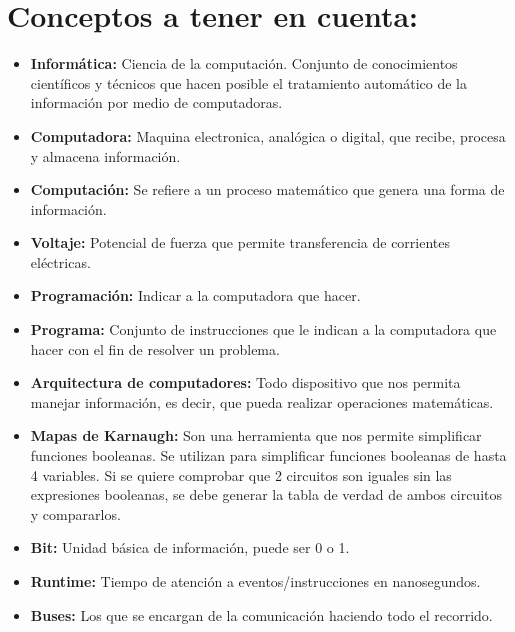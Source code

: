 \documentclass{templateNote}
\begin{document}

\portada
\margenes 

\section*{Conceptos a tener en cuenta:}
\begin{itemize}
    \item \textbf{Informática:} Ciencia de la computación. Conjunto de conocimientos científicos y técnicos que hacen posible el tratamiento automático de la información por medio de computadoras.
    \item \textbf{Computadora:} Maquina electronica, analógica o digital, que recibe, procesa y almacena información.
    \item \textbf{Computación:} Se refiere a un proceso matemático que genera una forma de información. 
    \item \textbf{Voltaje:} Potencial de fuerza que permite transferencia de corrientes eléctricas.
    \item \textbf{Programación:} Indicar a la computadora que hacer.
    \item \textbf{Programa:} Conjunto de instrucciones que le indican a la computadora que hacer con el fin de resolver un problema.
    \item \textbf{Arquitectura de computadores:} Todo dispositivo que nos permita manejar información, es decir, que pueda realizar operaciones matemáticas.
    \item \textbf{Mapas de Karnaugh:} Son una herramienta que nos permite simplificar funciones booleanas. Se utilizan para simplificar funciones booleanas de hasta 4 variables. Si se quiere comprobar que 2 circuitos son iguales sin las expresiones booleanas, se debe generar la tabla de verdad de ambos circuitos y compararlos.
    \item \textbf{Bit:} Unidad básica de información, puede ser 0 o 1.
    \item \textbf{Runtime:} Tiempo de atención a eventos/instrucciones en nanosegundos.
    \item \textbf{Buses:} Los que se encargan de la comunicación haciendo todo el recorrido. 
\end{itemize}
\newpage
\end{document}
